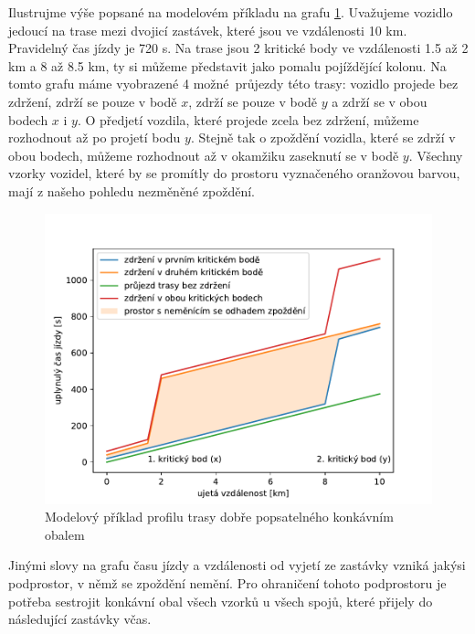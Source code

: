 \bigbreak

Ilustrujme výše popsané na modelovém příkladu na grafu \ref{fig:concave_hull}. Uvažujeme vozidlo jedoucí na trase mezi dvojicí zastávek, které jsou ve vzdálenosti 10 km. Pravidelný čas jízdy je 720 s. Na trase jsou 2 kritické body ve vzdálenosti 1.5 až 2 km a 8 až 8.5 km, ty si můžeme představit jako pomalu pojíždějící kolonu. Na tomto grafu máme vyobrazené 4 možné průjezdy této trasy: vozidlo projede bez zdržení, zdrží se pouze v bodě $x$, zdrží se pouze v bodě $y$ a zdrží se v obou bodech $x$ i $y$. O předjetí vozdila, které projede zcela bez zdržení, můžeme rozhodnout až po projetí bodu $y$. Stejně tak o zpoždění vozidla, které se zdrží v obou bodech, můžeme rozhodnout až v okamžiku zaseknutí se v bodě $y$. Všechny vzorky vozidel, které by se promítly do prostoru vyznačeného oranžovou barvou, mají z našeho pohledu nezměněné zpoždění.


\begin{figure}
\centering
  \includegraphics[width=\linewidth]{../img/concave_hull}
  \caption{Modelový příklad profilu trasy dobře popsatelného konkávním obalem}
  \label{fig:concave_hull}
\end{figure}


\bigbreak


Jinými slovy na grafu času jízdy a vzdálenosti od vyjetí ze zastávky vzniká jakýsi podprostor, v němž se zpoždění nemění. Pro ohraničení tohoto podprostoru je potřeba sestrojit konkávní obal všech vzorků u všech spojů, které přijely do následující zastávky včas.


\bigbreak


